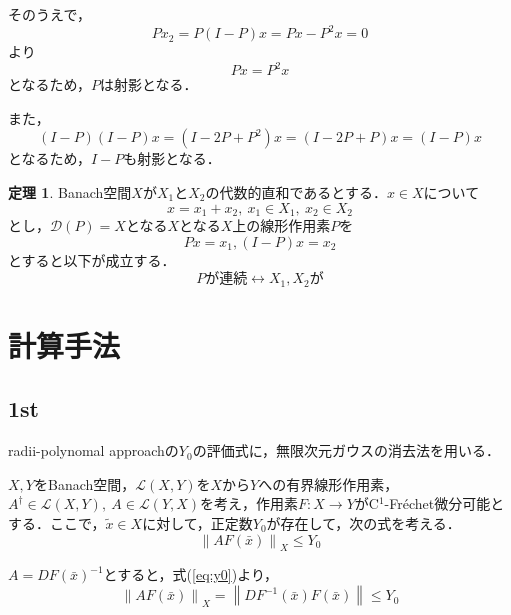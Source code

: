 \documentclass[11pt,a4paper]{jsarticle}
\theoremstyle{definition}
\newtheorem{thm}{定理}
\begin{document}
そのうえで，
\begin{equation*}
  Px_2 = P(I-P)x = Px - P^2x = 0
\end{equation*}
より
\begin{equation*}
  Px = P^2x
\end{equation*}
となるため，$P$は射影となる．

また，
\begin{equation*}
  (I-P)(I-P)x = (I-2P+P^2)x = (I - 2P + P)x = (I-P)x
\end{equation*}
となるため，$I-P$も射影となる．

\begin{thm}
  Banach空間$X$が$X_1$と$X_2$の代数的直和であるとする．$x \in X$について
  \begin{equation*}
    x = x_1 + x_2,\ x_1 \in X_1,\ x_2\in X_2
  \end{equation*}
  とし，$\mathcal{D}(P)=X$となる$X$となる$X$上の線形作用素$P$を
  \begin{equation*}
    Px = x_1, (I-P)x = x_2
  \end{equation*}
  とすると以下が成立する．
  \begin{equation*}
    Pが連続 \leftrightarrow X_1, X_2 が
  \end{equation*}
\end{thm}

\section{計算手法}

\subsection{1st}

radii-polynomal approachの$Y_0$の評価式に，無限次元ガウスの消去法を用いる．

$X,Y$をBanach空間，$\mathcal{L}(X,Y)$を$X$から$Y$への有界線形作用素，$A^\dagger \in \mathcal{L}(X,Y),\ A \in \mathcal{L}(Y,X)$を考え，作用素$F:X \rightarrow Y$がC$^1$-Fr\'{e}chet微分可能とする．ここで，$\tilde{x}\in X$に対して，正定数$Y_0$が存在して，次の式を考える．
\begin{equation}
  \left\| AF(\bar{x}) \right\|_X \leq Y_0
  \label{eq:y0}
\end{equation}

$A=DF(\bar{x})^{-1}$とすると，式(\ref{eq:y0})より，
\begin{equation}
  \left\| AF(\bar{x}) \right\|_X = \left\| DF^{-1}(\bar{x}) F(\bar{x}) \right\| \leq Y_0
  \label{eq:y1}
\end{equation}
\end{document}
